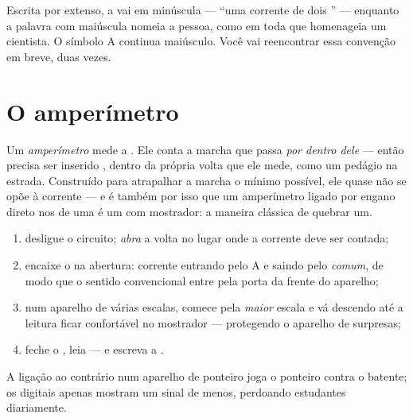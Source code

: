 \begin{remark}\label{rem:g8:intensity-ammeter:person}
Escrita por extenso, a  vai em minúscula --- ``uma corrente de
dois '' --- enquanto a palavra com maiúscula nomeia a pessoa,
como em toda  que homenageia um cientista. O símbolo \unit{A}
continua maiúsculo. Você vai reencontrar essa convenção em breve,
duas vezes.
\end{remark}

\section{O amperímetro}

\begin{definition}[Amperímetro]\label{def:g8:intensity-ammeter:ammeter}
Um \emph{amperímetro} mede a . Ele
conta a marcha que passa \emph{por dentro dele} --- então precisa ser
inserido \emph{}, dentro da própria volta que ele mede, como
um pedágio na estrada. Construído para atrapalhar a marcha o mínimo
possível, ele quase não se opõe à corrente --- e é também por isso
que um amperímetro ligado por engano direto nos  de uma
 é um  com mostrador: a maneira clássica de
quebrar um.
\end{definition}

\begin{method}\label{met:g8:intensity-ammeter:measure}
\begin{enumerate}
  \item desligue o circuito; \emph{abra} a volta no lugar onde a
        corrente deve ser contada;
  \item encaixe o  na abertura: corrente entrando pelo
         \unit{A} e saindo pelo  \emph{comum}, de modo
        que o sentido convencional entre pela porta da frente do
        aparelho;
  \item num aparelho de várias escalas, comece pela \emph{maior}
        escala e vá descendo até a leitura ficar confortável no
        mostrador --- protegendo o aparelho de surpresas;
  \item feche o , leia --- e escreva a .
\end{enumerate}
A ligação ao contrário num aparelho de ponteiro joga o ponteiro
contra o batente; os digitais apenas mostram um sinal de menos,
perdoando estudantes diariamente.
\end{method}

